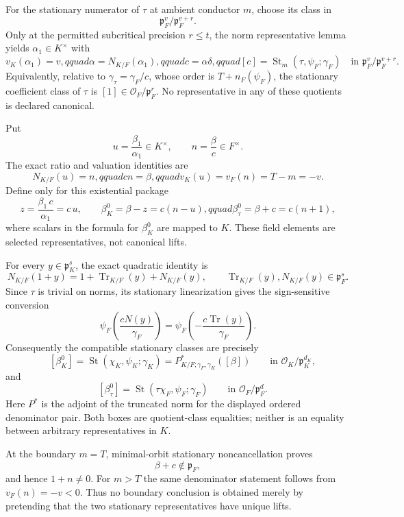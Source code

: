 \begin{theorem}
For the stationary numerator of $\tau$ at ambient conductor $m$, choose
its class in
\[
 \mathfrak p_F^v/\mathfrak p_F^{v+r}.
\]
Only at the permitted subcritical precision $r\leq t$, the norm
representative lemma yields $\alpha_1\in K^\times$ with
\[
 v_K(\alpha_1)=v,qquad
 \alpha=N_{K/F}(\alpha_1),qquad
 c=\alpha\delta,qquad
 [c]=\operatorname{St}_m(\tau,\psi_F;\gamma_F)
 \quad\text{in }
 \mathfrak p_F^v/\mathfrak p_F^{v+r}.
\]
Equivalently, relative to
\(\gamma_\tau=\gamma_F/c\), whose order is $T+n_F(\psi_F)$, the stationary
coefficient class of $\tau$ is $[1]\in\mathcal O_F/\mathfrak p_F^r$.
No representative in any of these quotients is declared canonical.

Put
\[
 u=\frac{\beta_1}{\alpha_1}\in K^\times,
 \qquad n=\frac{\beta}{c}\in F^\times.
\]
The exact ratio and valuation identities are
\[
 N_{K/F}(u)=n,qquad cn=\beta,qquad
 v_K(u)=v_F(n)=T-m=-v.
\]
Define only for this existential package
\[
 z=\frac{\beta_1\,c}{\alpha_1}=c\,u,\qquad
 \beta_K^0=\beta-z=c(n-u),qquad
 \beta_{\tau}^0=\beta+c=c(n+1),
\]
where scalars in the formula for $\beta_K^0$ are mapped to $K$.
These field elements are selected representatives, not canonical lifts.

For every $y\in\mathfrak p_K^s$, the exact quadratic identity is
\[
 N_{K/F}(1+y)=1+\operatorname{Tr}_{K/F}(y)+N_{K/F}(y),
 \qquad
 \operatorname{Tr}_{K/F}(y),N_{K/F}(y)\in\mathfrak p_F^s.
\]
Since $\tau$ is trivial on norms, its stationary linearization gives the
sign-sensitive conversion
\[
 \psi_F\!\left(\frac{cN(y)}{\gamma_F}\right)
 =\psi_F\!\left(-\frac{c\operatorname{Tr}(y)}{\gamma_F}\right).
\]
Consequently the compatible stationary classes are precisely
\[
 \boxed{\quad
 [\beta_K^0]
   =\operatorname{St}(\chi_K,\psi_K;\gamma_K)
   =P^*_{K/F;\gamma_F,\gamma_K}
       ([\beta])
 \quad}
 \quad\text{in }\mathcal O_K/\mathfrak p_K^{d_K},
\]
and
\[
 \boxed{\quad
 [\beta_{\tau}^0]
   =\operatorname{St}(\tau\chi_F,\psi_F;\gamma_F)
 \quad}
 \quad\text{in }\mathcal O_F/\mathfrak p_F^d.
\]
Here $P^*$ is the adjoint of the truncated norm for the displayed ordered
denominator pair.  Both boxes are quotient-class equalities; neither is an
equality between arbitrary representatives in $K$.

At the boundary $m=T$, minimal-orbit stationary noncancellation proves
\[
 \beta+c\notin\mathfrak p_F,
\]
and hence $1+n\ne0$.  For $m>T$ the same denominator statement follows
from $v_F(n)=-v<0$.  Thus no boundary conclusion is obtained merely by
pretending that the two stationary representatives have unique lifts.


\end{theorem}
